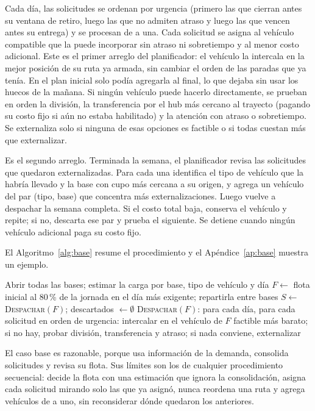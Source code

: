 Cada día, las solicitudes se ordenan por urgencia (primero las que cierran antes su ventana de retiro, luego las que no admiten atraso y luego las que vencen antes su entrega) y se procesan de a una. Cada solicitud se asigna al vehículo compatible que la puede incorporar sin atraso ni sobretiempo y al menor costo adicional. Este es el primer arreglo del planificador: el vehículo la intercala en la mejor posición de su ruta ya armada, sin cambiar el orden de las paradas que ya tenía. En el plan inicial solo podía agregarla al final, lo que dejaba sin usar los huecos de la mañana. Si ningún vehículo puede hacerlo directamente, se prueban en orden la división, la transferencia por el hub más cercano al trayecto (pagando su costo fijo si aún no estaba habilitado) y la atención con atraso o sobretiempo. Se externaliza solo si ninguna de esas opciones es factible o si todas cuestan más que externalizar.

 Es el segundo arreglo. Terminada la semana, el planificador revisa las solicitudes que quedaron externalizadas. Para cada una identifica el tipo de vehículo que la habría llevado y la base con cupo más cercana a su origen, y agrega un vehículo del par (tipo, base) que concentra más externalizaciones. Luego vuelve a despachar la semana completa. Si el costo total baja, conserva el vehículo y repite; si no, descarta ese par y prueba el siguiente. Se detiene cuando ningún vehículo adicional paga su costo fijo.

El Algoritmo~\ref{alg:base} resume el procedimiento y el Apéndice~\ref{ap:base} muestra un ejemplo.

\begin{algorithm}[htbp]
\caption{Caso base: planificación por reglas.}\label{alg:base}
\small
{}
Abrir todas las bases; estimar la carga por base, tipo de vehículo y día\;
$F \leftarrow$ flota inicial al 80\,\% de la jornada en el día más exigente; repartirla entre bases\;
$S \leftarrow$ \textsc{Despachar}$(F)$; descartados $\leftarrow \emptyset$\;
\;
\BlankLine
\textsc{Despachar}$(F)$: para cada día, para cada solicitud en orden de urgencia: intercalar en el vehículo de $F$ factible más barato; si no hay, probar división, transferencia y atraso; si nada conviene, externalizar\;
\end{algorithm}

El caso base es razonable, porque usa información de la demanda, consolida solicitudes y revisa su flota. Sus límites son los de cualquier procedimiento secuencial: decide la flota con una estimación que ignora la consolidación, asigna cada solicitud mirando solo las que ya asignó, nunca reordena una ruta y agrega vehículos de a uno, sin reconsiderar dónde quedaron los anteriores.
